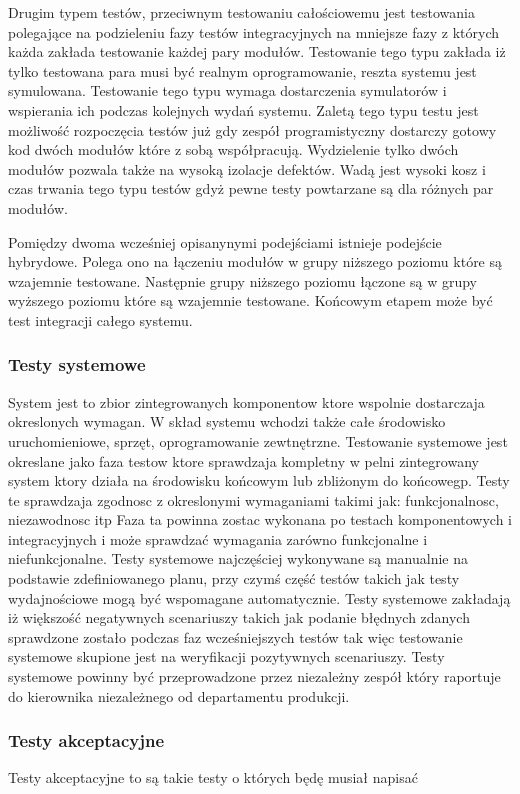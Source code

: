 Drugim typem testów, przeciwnym testowaniu całościowemu jest testowania polegające na podzieleniu fazy testów integracyjnych na mniejsze fazy z których każda zakłada testowanie każdej pary modułów. Testowanie tego typu zakłada iż tylko testowana para musi być realnym oprogramowanie, reszta systemu jest symulowana. Testowanie tego typu wymaga dostarczenia symulatorów i wspierania ich podczas kolejnych wydań systemu. Zaletą tego typu testu jest możliwość rozpoczęcia testów już gdy zespół programistyczny dostarczy gotowy kod dwóch modułów które z sobą współpracują. Wydzielenie tylko dwóch modułów pozwala także na wysoką izolacje defektów. Wadą jest wysoki kosz i czas trwania tego typu testów gdyż pewne testy powtarzane są dla różnych par modułów.

Pomiędzy dwoma wcześniej opisanynymi podejściami istnieje podejście hybrydowe. Polega ono na łączeniu modułów w grupy niższego poziomu które są wzajemnie testowane. Następnie grupy niższego poziomu łączone są w grupy wyższego poziomu które są wzajemnie testowane. Końcowym etapem może być test integracji całego systemu.
\subsubsection{Testy systemowe}
System jest to zbior zintegrowanych komponentow ktore wspolnie dostarczaja okreslonych wymagan. W skład systemu wchodzi także całe środowisko uruchomieniowe, sprzęt, oprogramowanie zewtnętrzne. Testowanie systemowe jest okreslane jako faza testow ktore sprawdzaja kompletny w pelni zintegrowany system ktory działa na środowisku końcowym lub zbliżonym do końcowegp. Testy te sprawdzaja zgodnosc z okreslonymi wymaganiami takimi jak: funkcjonalnosc, niezawodnosc itp
Faza ta powinna zostac wykonana po testach komponentowych i integracyjnych i może sprawdzać wymagania zarówno funkcjonalne i niefunkcjonalne.
Testy systemowe najczęściej wykonywane są manualnie na podstawie zdefiniowanego planu, przy czymś część testów takich jak testy wydajnościowe mogą być wspomagane automatycznie.
Testy systemowe zakładają iż większość negatywnych scenariuszy takich jak podanie błędnych zdanych sprawdzone zostało podczas faz wcześniejszych testów tak więc testowanie systemowe skupione jest na weryfikacji pozytywnych scenariuszy. 
Testy systemowe powinny być przeprowadzone przez niezależny zespół który raportuje do kierownika niezależnego od departamentu produkcji. 

\subsubsection{Testy akceptacyjne}
Testy akceptacyjne to są takie testy o których będę musiał napisać


